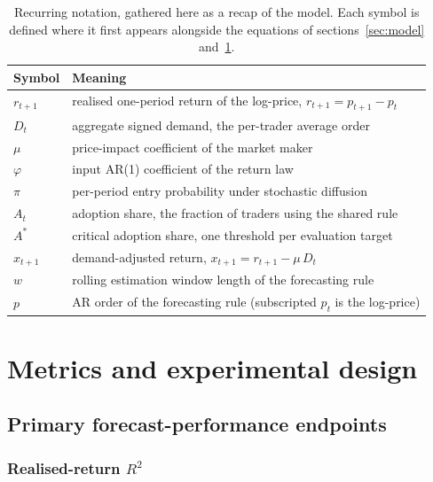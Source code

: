 \documentclass[12pt]{article}
\begin{document}
\begin{table}[H]
\centering
\caption{Recurring notation, gathered here as a recap of the model. Each symbol is defined where it first appears alongside the equations of sections~\ref{sec:model} and~\ref{sec:metrics}.}
\label{tab:notation}
\begin{tabular}{@{}l l@{}}
\toprule
Symbol & Meaning \\
\midrule
$r_{t+1}$ & realised one-period return of the log-price, $r_{t+1} = p_{t+1} - p_t$ \\
$D_t$ & aggregate signed demand, the per-trader average order \\
$\mu$ & price-impact coefficient of the market maker \\
$\varphi$ & input AR(1) coefficient of the return law \\
$\pi$ & per-period entry probability under stochastic diffusion \\
$A_t$ & adoption share, the fraction of traders using the shared rule \\
$A^{*}$ & critical adoption share, one threshold per evaluation target \\
$x_{t+1}$ & demand-adjusted return, $x_{t+1} = r_{t+1} - \mu\, D_t$ \\
$w$ & rolling estimation window length of the forecasting rule \\
$p$ & AR order of the forecasting rule (subscripted $p_t$ is the log-price) \\
\bottomrule
\end{tabular}
\end{table}

\section{Metrics and experimental design}\label{sec:metrics}

\subsection{Primary forecast-performance endpoints}

\subsubsection{Realised-return $R^{2}$}\label{sec:metrics-r2-realised}
\end{document}
